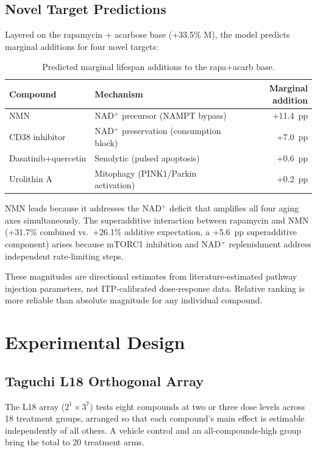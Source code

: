 \documentclass[11pt]{article}
\begin{document}
\subsection{Novel Target Predictions}

Layered on the rapamycin + acarbose base (+33.5\% M), the model predicts marginal additions for four novel targets:

\begin{table}[ht]
\centering
\caption{Predicted marginal lifespan additions to the rapa+acarb base.}
\begin{tabular}{@{}llr@{}}
\toprule
Compound & Mechanism & Marginal addition \\
\midrule
NMN & NAD$^+$ precursor (NAMPT bypass) & +11.4~pp \\
CD38 inhibitor & NAD$^+$ preservation (consumption block) & +7.0~pp \\
Dasatinib+quercetin & Senolytic (pulsed apoptosis) & +0.6~pp \\
Urolithin A & Mitophagy (PINK1/Parkin activation) & +0.2~pp \\
\bottomrule
\end{tabular}
\end{table}

NMN leads because it addresses the NAD$^+$ deficit that amplifies all four aging axes simultaneously. The superadditive interaction between rapamycin and NMN (+31.7\% combined vs.\ +26.1\% additive expectation, a +5.6~pp superadditive component) arises because mTORC1 inhibition and NAD$^+$ replenishment address independent rate-limiting steps.

These magnitudes are directional estimates from literature-estimated pathway injection parameters, not ITP-calibrated dose-response data. Relative ranking is more reliable than absolute magnitude for any individual compound.

\section{Experimental Design}

\subsection{Taguchi L18 Orthogonal Array}

The L18 array ($2^1 \times 3^7$) tests eight compounds at two or three dose levels across 18 treatment groups, arranged so that each compound's main effect is estimable independently of all others. A vehicle control and an all-compounds-high group bring the total to 20 treatment arms.
\end{document}
